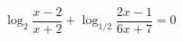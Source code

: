 \begin{ex}[type=equation]
	\begin{condition}
		$\log_2 \dfrac{x - 2}{x + 2} + \log_{1/2}\dfrac{2x - 1}{6x + 7} = 0$
	\end{condition}
\end{ex}